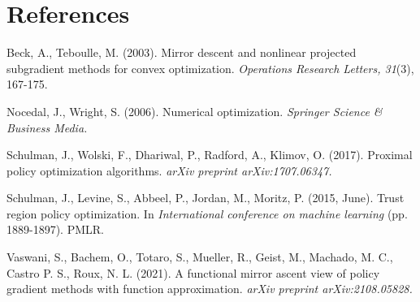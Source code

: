 \documentclass[a4paper, 10pt]{article}
\begin{document}
\section*{References}

\medskip
\small
\begin{list}{}{%
    \setlength{\topsep}{0pt}%
    \setlength{\leftmargin}{0.2in}%
    \setlength{\listparindent}{-0.2in}%
    \setlength{\itemindent}{-0.2in}%
    \setlength{\parsep}{\parskip}%
  }%

\item[] Beck, A., Teboulle, M. (2003). Mirror descent and nonlinear projected subgradient methods for convex optimization. \textit{Operations Research Letters, 31}(3), 167-175.

\item[] Nocedal, J., Wright, S. (2006). Numerical optimization. \textit{Springer Science \& Business Media.}

\item[] Schulman, J., Wolski, F., Dhariwal, P., Radford, A., Klimov, O. (2017). Proximal policy optimization algorithms. \textit{arXiv preprint arXiv:1707.06347.}

\item[] Schulman, J., Levine, S., Abbeel, P., Jordan, M., Moritz, P. (2015, June). Trust region policy optimization. In \textit{International conference on machine learning} (pp. 1889-1897). PMLR.
  
\item[] Vaswani, S., Bachem, O., Totaro, S., Mueller, R., Geist, M., Machado, M. C., Castro P. S., Roux, N. L. (2021). A functional mirror ascent view of policy gradient methods with function approximation. \textit{arXiv preprint arXiv:2108.05828.}
  
\end{list}
\end{document}

